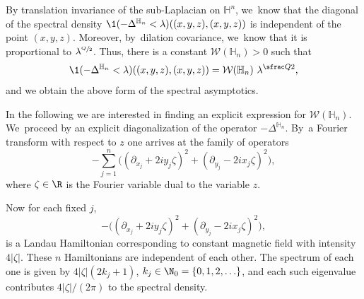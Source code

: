 By translation invariance of the sub-Laplacian on $\mathbb H^n$, we~know that the diagonal of the spectral density $\1(-\Delta^{\mathbb H_n} <\lambda)((x,y,z),(x,y,z))$ is independent of the point $(x,y,z)$. Moreover, by~dilation covariance, we~know that it is proportional to $\lambda^{\sfrac{Q}{2}}$. Thus, there is a constant $\mathcal W(\mathbb H_n)>0$ such that
\begin{equation}\label{w2}
\1(-\Delta^{\mathbb H_n} <\lambda)((x,y,z),(x,y,z)) = \mathcal W(\mathbb H_n)\ \lambda^{\sfrac Q2},
\end{equation}
and we obtain the above form of the spectral asymptotics.

In the following we are interested in finding an explicit expression for $\mathcal W(\mathbb H_n)$. We~proceed by an explicit diagonalization of the operator $-\Delta^{\mathbb H_n}$. By~a Fourier transform with respect to $z$ one arrives at the family of operators
\[
- \sum_{j=1}^n \bigl((\partial_{x_j} + 2iy_j \zeta)^2 + (\partial_{y_j} - 2i x_j \zeta)^2 \bigr),
\]
where $\zeta\in\R$ is the Fourier variable dual to the variable $z$.

Now for each fixed $j$,
\[
- \bigl((\partial_{x_j} + 2i y_j \zeta)^2 + (\partial_{y_j} - 2ix_j \zeta)^2 \bigr),
\]
is a Landau Hamiltonian corresponding to constant magnetic field with intensity $4|\zeta|$. These $n$ Hamiltonians are independent of each other. The spectrum of each one is given by $4|\zeta|(2k_j +1)$, $k_j\in\N_0 =\{0,1,2,\ldots\}$, and each such eigenvalue contributes $4|\zeta|/(2\pi)$ to the spectral density.

